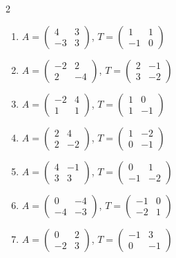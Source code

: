 \begin{multicols}{2}
\begin{enumerate}[label=\arabic*., leftmargin=*]
\item $A=\begin{pmatrix}4 & 3\\ -3 & 3\end{pmatrix}$, $T=\begin{pmatrix}1 & 1\\ -1 & 0\end{pmatrix}$
\item $A=\begin{pmatrix}-2 & 2\\ 2 & -4\end{pmatrix}$, $T=\begin{pmatrix}2 & -1\\ 3 & -2\end{pmatrix}$
\item $A=\begin{pmatrix}-2 & 4\\ 1 & 1\end{pmatrix}$, $T=\begin{pmatrix}1 & 0\\ 1 & -1\end{pmatrix}$
\item $A=\begin{pmatrix}2 & 4\\ 2 & -2\end{pmatrix}$, $T=\begin{pmatrix}1 & -2\\ 0 & -1\end{pmatrix}$
\item $A=\begin{pmatrix}4 & -1\\ 3 & 3\end{pmatrix}$, $T=\begin{pmatrix}0 & 1\\ -1 & -2\end{pmatrix}$
\item $A=\begin{pmatrix}0 & -4\\ -4 & -3\end{pmatrix}$, $T=\begin{pmatrix}-1 & 0\\ -2 & 1\end{pmatrix}$
\item $A=\begin{pmatrix}0 & 2\\ -2 & 3\end{pmatrix}$, $T=\begin{pmatrix}-1 & 3\\ 0 & -1\end{pmatrix}$

\end{enumerate}
\end{multicols}
